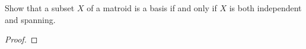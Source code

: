 \prob
{
    Show that a subset $X$ of a matroid is a basis if and only if $X$ is both independent and spanning.
}
\begin{proof}
\end{proof}
